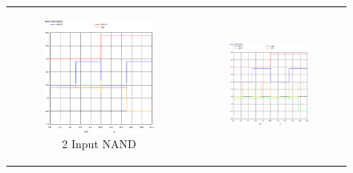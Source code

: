 \documentclass[conference]{IEEEtran}
\begin{document}
\begin{figure}[H]
    \centering
    \begin{tabular}{cc}
        \begin{subfigure}{0.44\linewidth}
            \centering
            \includegraphics[width=\textwidth]{images/nand_cmos_tran.eps}
            \caption{2 Input NAND}
        \end{subfigure} &
        \begin{subfigure}{0.44\linewidth}
            \centering
            \includegraphics[width=\textwidth]{images/nand_3_cmos_tran.eps}

\end{subfigure}
\end{tabular}
\end{figure}
\end{document}
